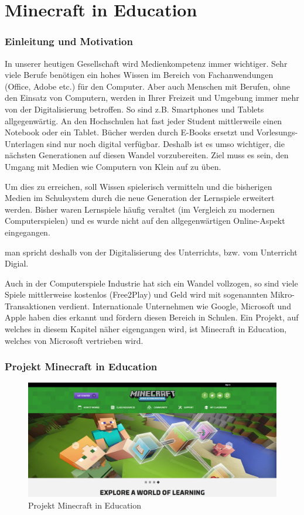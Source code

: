 \chapter{Minecraft in Education}
\subsection{Einleitung und Motivation}
In unserer heutigen Gesellschaft wird Medienkompetenz immer wichtiger. Sehr viele Berufe benötigen ein hohes Wissen im Bereich von Fachanwendungen (Office, Adobe etc.) für den Computer. 
Aber auch Menschen mit Berufen, ohne den Einsatz von Computern, werden in Ihrer Freizeit und Umgebung immer mehr von der Digitalisierung betroffen.
So sind z.B. Smartphones und Tablets allgegenwärtig. An den Hochschulen hat fast jeder Student mittlerweile einen Notebook oder ein Tablet.
Bücher werden durch E-Books ersetzt und Vorlesungs-Unterlagen sind nur noch digital verfügbar. Deshalb ist es umso wichtiger, die nächsten Generationen auf diesen Wandel vorzubereiten. 
Ziel muss es sein, den Umgang mit Medien wie Computern von Klein auf zu üben.

Um dies zu erreichen, soll Wissen spielerisch vermitteln und die bisherigen Medien im Schulsystem durch die neue Generation der Lernspiele erweitert werden.
Bisher waren Lernspiele häufig veraltet (im Vergleich zu modernen Computerspielen) und es wurde nicht auf den allgegenwärtigen Online-Aspekt eingegangen.

man spricht deshalb von der Digitalisierung des Unterrichts, bzw. vom Unterricht Digial.

Auch in der Computerspiele Industrie hat sich ein Wandel vollzogen, so sind viele Spiele mittlerweise kostenlos (Free2Play)
und Geld wird mit sogenannten Mikro-Transaktionen verdient. 
Internationale Unternehmen wie Google, Microsoft und Apple haben dies erkannt und fördern diesen Bereich in Schulen.
Ein Projekt, auf welches in diesem Kapitel näher eigengangen wird, ist Minecraft in Education, welches von Microsoft vertrieben wird.

\subsection{Projekt Minecraft in Education}

\begin{figure}[ht]
	\centering
	\includegraphics[width=\textwidth,height=\textheight,keepaspectratio]{images/Minecraft.png}
	\caption{Projekt Minecraft in Education}
	\label{projectMinecraft}
\end{figure}

